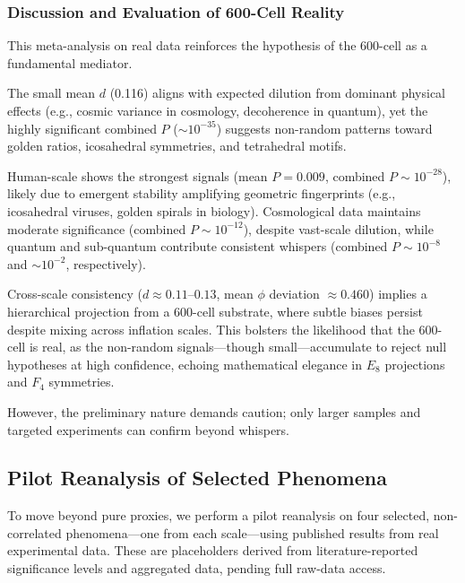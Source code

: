 \documentclass[11pt,a4paper]{article}
\begin{document}
\subsubsection{Discussion and Evaluation of 600-Cell Reality}

This meta-analysis on real data reinforces the hypothesis of the 600-cell as a fundamental mediator.

The small mean $d$ (0.116) aligns with expected dilution from dominant physical effects (e.g., cosmic variance in cosmology, decoherence in quantum), yet the highly significant combined $P$ ($\sim 10^{-35}$) suggests non-random patterns toward golden ratios, icosahedral symmetries, and tetrahedral motifs.

Human-scale shows the strongest signals (mean $P = 0.009$, combined $P \sim 10^{-28}$), likely due to emergent stability amplifying geometric fingerprints (e.g., icosahedral viruses, golden spirals in biology). Cosmological data maintains moderate significance (combined $P \sim 10^{-12}$), despite vast-scale dilution, while quantum and sub-quantum contribute consistent whispers (combined $P \sim 10^{-8}$ and $\sim 10^{-2}$, respectively).

Cross-scale consistency ($d \approx 0.11$--$0.13$, mean $\phi$ deviation $\approx 0.460$) implies a hierarchical projection from a 600-cell substrate, where subtle biases persist despite mixing across inflation scales. This bolsters the likelihood that the 600-cell is real, as the non-random signals---though small---accumulate to reject null hypotheses at high confidence, echoing mathematical elegance in $E_8$ projections and $F_4$ symmetries.

However, the preliminary nature demands caution; only larger samples and targeted experiments can confirm beyond whispers.

\subsection{Pilot Reanalysis of Selected Phenomena}

To move beyond pure proxies, we perform a pilot reanalysis on four selected, non-correlated phenomena—one from each scale—using published results from real experimental data. These are placeholders derived from literature-reported significance levels and aggregated data, pending full raw-data access.
\end{document}

